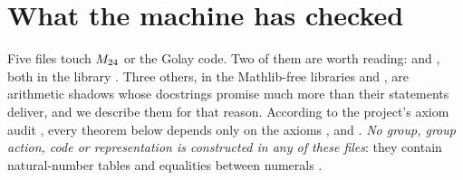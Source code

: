\section{What the machine has checked}\label{sec:m24:lean}

\begin{sloppypar}
Five files touch $M_{24}$ or the Golay code. Two of them are worth reading:
 and , both in the library
. Three others, in the Mathlib-free libraries
 and , are arithmetic shadows whose
docstrings promise much more than their statements deliver, and we describe them for that
reason. According to the
project's axiom audit , every theorem
below depends only on the axioms ,  and
. \emph{No group, group action, code or representation is constructed in any of
these files}: they contain natural-number tables and equalities between numerals
.
\end{sloppypar}

